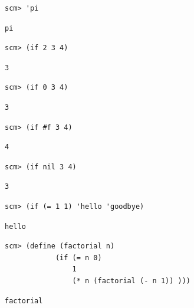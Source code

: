 \documentclass{exam}
\begin{document}
\begin{questions}
\begin{blocksection}
\begin{lstlisting}
scm> 'pi
\end{lstlisting}
\begin{solution}[.25in]
\begin{lstlisting}
pi
\end{lstlisting}
\end{solution}

\begin{lstlisting}
scm> (if 2 3 4)
\end{lstlisting}
\begin{solution}[.25in]
\begin{lstlisting}
3
\end{lstlisting}
\end{solution}

\begin{lstlisting}
scm> (if 0 3 4)
\end{lstlisting}
\begin{solution}[.25in]
\begin{lstlisting}
3
\end{lstlisting}
\end{solution}

\begin{lstlisting}
scm> (if #f 3 4)
\end{lstlisting}
\begin{solution}[.25in]
\begin{lstlisting}
4
\end{lstlisting}
\end{solution}

\begin{lstlisting}
scm> (if nil 3 4)
\end{lstlisting}
\begin{solution}[.25in]
\begin{lstlisting}
3
\end{lstlisting}
\end{solution}

\begin{lstlisting}
scm> (if (= 1 1) 'hello 'goodbye)
\end{lstlisting}
\begin{solution}[.25in]
\begin{lstlisting}
hello
\end{lstlisting}
\end{solution}

\begin{lstlisting}
scm> (define (factorial n)
            (if (= n 0)
                1
                (* n (factorial (- n 1)) )))
\end{lstlisting}
\begin{solution}[.25in]
\begin{lstlisting}
factorial
\end{lstlisting}
\end{solution}


\end{blocksection}
\end{questions}
\end{document}
